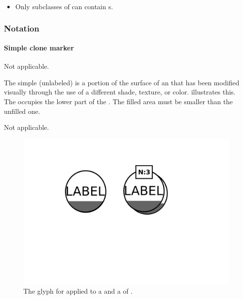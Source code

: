 \begin{itemize}
\item Only subclasses of  can contain
s.
\end{itemize}

\subsubsection{Notation}

\paragraph{Simple clone marker}

\begin{glyphDescription}

\glyphSboTerm Not applicable.

\glyphContainer The simple (unlabeled)  is a
portion of the surface of an  that has been modified
visually through the use of a different shade, texture, or color.
 illustrates this.  The 
occupies the lower part of the . The filled area must be
smaller than the unfilled one.

\glyphLabel Not applicable.

\end{glyphDescription}

\begin{figure}[htb]
  \centering
  \includegraphics[scale = 0.3]{images/simpleCloneMarker}
  \caption{The \PD glyph for  applied to a  and a  of .}
  \label{fig:techref:simpleCloneMarker}
\end{figure}

